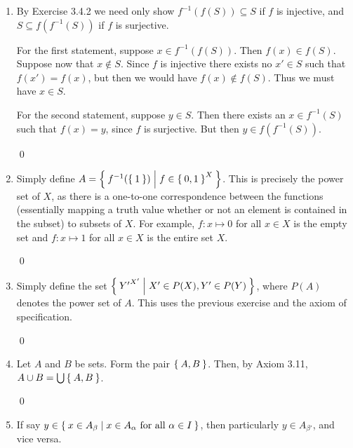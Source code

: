 \begin{enumerate}[Ex. 3.4.1.]
    Suppose $x \in f^{-1}(U \cup V)$. Then $f(x) = y$ for some $y \in U \cup V$,
    say $y \in U$. Consequently, $x \in f^{-1}(U)$, by definition, and so
    $x \in f^{-1}(U) \cup f^{-1}(V)$.

    Conversely, if $x \in f^{-1}(U) \cup f^{-1}(V)$, say $x \in f^{-1}(U)$,
    then there exists a $y \in U \subseteq U \cup V$ such that $f(x) = y$.
    Thus, by definition, $x \in f^{-1}(U \cup V)$.

    \qed

    \item By Exercise 3.4.2 we need only show $f^{-1}(f(S)) \subseteq S$ if $f$
    is injective, and $S \subseteq f(f^{-1}(S))$ if $f$ is surjective.

    For the first statement, suppose $x \in f^{-1}(f(S))$. Then $f(x) \in f(S)$.
    Suppose now that $x \not\in S$. Since $f$ is injective there exists no
    $x'\in S$ such that $f(x') = f(x)$, but then we would have $f(x) \not\in f(S)$.
    Thus we must have $x \in S$.

    For the second statement, suppose $y \in S$. Then there exists an $x \in
    f^{-1}(S)$ such that $f(x) = y$, since $f$ is surjective. But then
    $y \in f(f^{-1}(S))$.

    \qed

    \item Simply define $A = \Set{f^{-1}(\Set{1}) | f \in \Set{0,1}^X}$.
    This is precisely the power set of $X$, as there is a one-to-one
    correspondence between the functions (essentially mapping a truth value
    whether or not an element is contained in the subset) to subsets of $X$.
    For example, $f : x \mapsto 0$ for all $x\in X$ is the empty set and
    $f : x \mapsto 1$ for all $x\in X$ is the entire set $X$.

    \qed

    \item Simply define the set $\Set{{Y'}^{X'} | X'\in P(X), Y'\in P(Y)}$,
    where $P(A)$ denotes the power set of $A$. This uses the previous exercise
    and the axiom of specification.

    \qed

    \item Let $A$ and $B$ be sets. Form the pair $\Set{A, B}$. Then, by Axiom 3.11,
    $A \cup B = \bigcup\Set{A, B}$.

    \qed

    \item If say $y \in \Set{x\in A_\beta | x\in A_\alpha\text{ for all } 
    \alpha\in I}$, then particularly $y \in A_{\beta'}$, and vice versa.


\end{enumerate}
